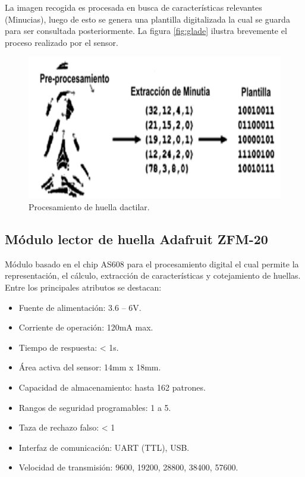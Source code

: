La imagen recogida es procesada en busca de características relevantes (Minucias), luego de esto se genera una plantilla digitalizada la cual se guarda para ser consultada posteriormente.
La figura \ref{fig:glade} ilustra brevemente el proceso realizado por el sensor.

\begin{figure}[h]
	\centering
	\includegraphics[scale=.2]{./Figures/huella.png}
	\caption{Procesamiento de huella dactilar.}
	\label{fig:huella}
\end{figure}

\subsection{Módulo lector de huella Adafruit ZFM-20}
Módulo basado en el chip AS608 para el procesamiento digital el cual permite la representación, el cálculo, extracción de características y  cotejamiento de huellas.
Entre los principales atributos se destacan:

\begin{itemize}
\item Fuente de alimentación: 3.6 – 6V. 
\item Corriente de operación: 120mA max.
\item Tiempo de respuesta: < 1s.
\item Área activa del sensor: 14mm x 18mm.
\item Capacidad de almacenamiento: hasta 162 patrones.
\item Rangos de seguridad programables: 1 a 5.
\item Taza de rechazo falso: < 1 %
\item Interfaz de comunicación: UART (TTL), USB.
\item Velocidad de transmisión: 9600, 19200, 28800, 38400, 57600.
\end{itemize}


